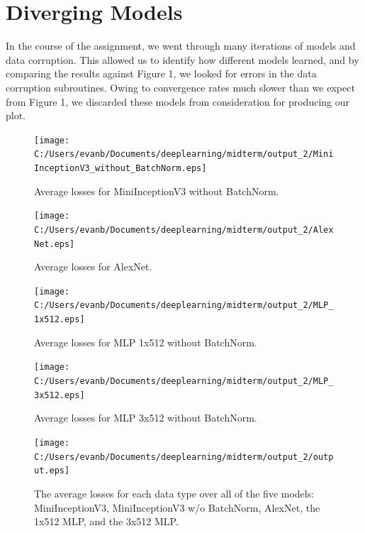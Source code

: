 \documentclass[12pt]{article}
\begin{document}
\section{Diverging Models}

In the course of the assignment, we went through many iterations of models and data corruption. This allowed us to identify how different models learned, and by comparing the results against Figure 1, we looked for errors in the data corruption subroutines. Owing to convergence rates much slower than we expect from Figure 1, we discarded these models from consideration for producing our plot.

\begin{figure}[H]
		\centering
		\texttt{[image: C:/Users/evanb/Documents/deeplearning/midterm/output\_2/MiniInceptionV3\_without\_BatchNorm.eps]}
		\caption{Average losses for MiniInceptionV3 without BatchNorm.}
\end{figure}

\begin{figure}[H]
		\centering
		\texttt{[image: C:/Users/evanb/Documents/deeplearning/midterm/output\_2/AlexNet.eps]}
		\caption{Average losses for AlexNet.}
\end{figure}

\begin{figure}[H]
		\centering
		\texttt{[image: C:/Users/evanb/Documents/deeplearning/midterm/output\_2/MLP\_1x512.eps]}
		\caption{Average losses for MLP 1x512 without BatchNorm.}
\end{figure}

\begin{figure}[H]
		\centering
		\texttt{[image: C:/Users/evanb/Documents/deeplearning/midterm/output\_2/MLP\_3x512.eps]}
		\caption{Average losses for MLP 3x512 without BatchNorm.}
\end{figure}

\begin{figure}[H]
	\centering
	\texttt{[image: C:/Users/evanb/Documents/deeplearning/midterm/output\_2/output.eps]}
	\caption{The average losses for each data type over all of the five models: MiniInceptionV3, MiniInceptionV3 w/o BatchNorm, AlexNet, the 1x512 MLP, and the 3x512 MLP.}
\end{figure}
\end{document}
